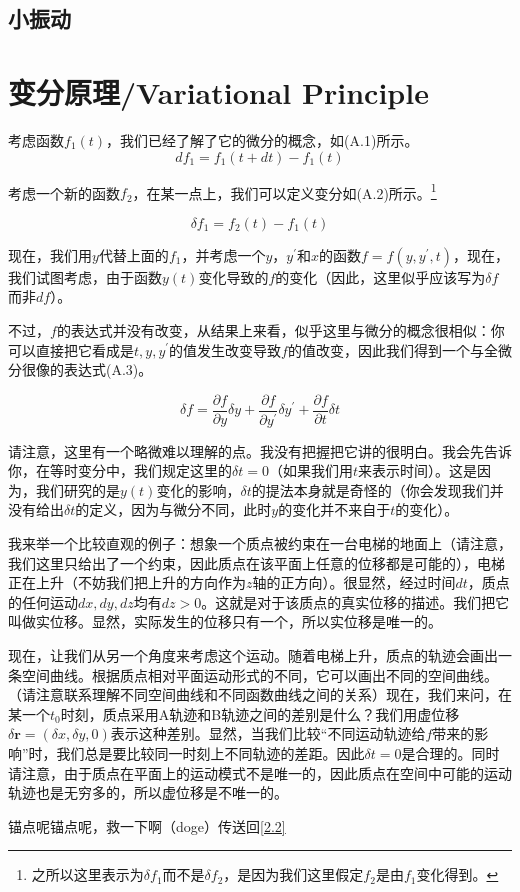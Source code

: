\documentclass[a4paper, 10pt, openany]{book}%
\begin{document}
\section{小振动}




\newpage

\appendix
\chapter{变分原理/Variational Principle}

\label{appendix A}
考虑函数$f_1(t)$，我们已经了解了它的微分的概念，如(A.1)所示。
\begin{equation}
  df_1=f_1(t+dt)-f_1(t)
\end{equation}

考虑一个新的函数$f_2$，在某一点上，我们可以定义变分如(A.2)所示。\footnote{之所以这里表示为$\delta f_1$而不是$\delta f_2$，是因为我们这里假定$f_2$是由$f_1$变化得到。}

\begin{equation}
  \delta f_1=f_2(t)-f_1(t)
\end{equation}



现在，我们用$y$代替上面的$f_1$，并考虑一个$y$，$y^\prime$和$x$的函数$f=f(y,y^\prime,t)$，现在，我们试图考虑，由于函数$y(t)$变化导致的$f$的变化（因此，这里似乎应该写为$\delta f$而非$df$）。

不过，$f$的表达式并没有改变，从结果上来看，似乎这里与微分的概念很相似：你可以直接把它看成是$t,y,y^\prime$的值发生改变导致$f$的值改变，因此我们得到一个与全微分很像的表达式(A.3)。

\begin{equation}
  \delta f=\frac{\partial f}{\partial y}\delta y+\frac{\partial f}{\partial y^\prime}\delta y^\prime+\frac{\partial f}{\partial t}\delta t
\end{equation}

请注意，这里有一个略微难以理解的点。我没有把握把它讲的很明白。我会先告诉你，在等时变分中，我们规定这里的$\delta t=0$（如果我们用$t$来表示时间）。这是因为，我们研究的是$y(t)$变化的影响，$\delta t$的提法本身就是奇怪的（你会发现我们并没有给出$\delta t$的定义，因为与微分不同，此时$y$的变化并不来自于$t$的变化）。

我来举一个比较直观的例子：想象一个质点被约束在一台电梯的地面上（请注意，我们这里只给出了一个约束，因此质点在该平面上任意的位移都是可能的），电梯正在上升（不妨我们把上升的方向作为$z$轴的正方向）。很显然，经过时间$dt$，质点的任何运动$dx,dy,dz$均有$dz>0$。这就是对于该质点的真实位移的描述。我们把它叫做实位移。显然，实际发生的位移只有一个，所以实位移是唯一的。

现在，让我们从另一个角度来考虑这个运动。随着电梯上升，质点的轨迹会画出一条空间曲线。根据质点相对平面运动形式的不同，它可以画出不同的空间曲线。（请注意联系理解不同空间曲线和不同函数曲线之间的关系）现在，我们来问，在某一个$t_0$时刻，质点采用A轨迹和B轨迹之间的差别是什么？我们用虚位移$\delta \textbf{r}=(\delta x,\delta y,0)$表示这种差别。显然，当我们比较“不同运动轨迹给$f$带来的影响”时，我们总是要比较同一时刻上不同轨迹的差距。因此$\delta t=0$是合理的。同时请注意，由于质点在平面上的运动模式不是唯一的，因此质点在空间中可能的运动轨迹也是无穷多的，所以虚位移是不唯一的。

锚点呢锚点呢，救一下啊（doge）传送回\ref{2.2}
\end{document}
